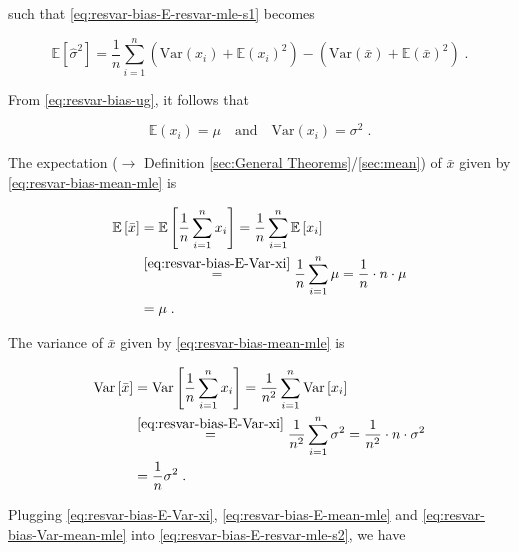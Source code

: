 \documentclass[a4paper,12pt,twoside]{book}
\begin{document}
such that \eqref{eq:resvar-bias-E-resvar-mle-s1} becomes

\begin{equation} \label{eq:resvar-bias-E-resvar-mle-s2}
\mathbb{E}\left[ \hat{\sigma}^2 \right] = \frac{1}{n} \sum_{i=1}^{n} \left( \mathrm{Var}(x_i) + \mathbb{E}(x_i)^2 \right) - \left( \mathrm{Var}(\bar{x}) + \mathbb{E}(\bar{x})^2 \right) \; .
\end{equation}

From \eqref{eq:resvar-bias-ug}, it follows that

\begin{equation} \label{eq:resvar-bias-E-Var-xi}
\mathbb{E}(x_i) = \mu \quad \text{and} \quad \mathrm{Var}(x_i) = \sigma^2 \; .
\end{equation}

The expectation ($\rightarrow$ Definition \ref{sec:General Theorems}/\ref{sec:mean}) of $\bar{x}$ given by \eqref{eq:resvar-bias-mean-mle} is

\begin{equation} \label{eq:resvar-bias-E-mean-mle}
\begin{split}
\mathbb{E}\left[ \bar{x} \right] &= \mathbb{E}\left[ \frac{1}{n} \sum_{i=1}^{n} x_i \right] = \frac{1}{n} \sum_{i=1}^{n} \mathbb{E}\left[ x_i \right] \\
&\overset{\eqref{eq:resvar-bias-E-Var-xi}}{=} \frac{1}{n} \sum_{i=1}^{n} \mu = \frac{1}{n} \cdot n \cdot \mu \\
&= \mu \; .
\end{split}
\end{equation}

The variance of $\bar{x}$ given by \eqref{eq:resvar-bias-mean-mle} is

\begin{equation} \label{eq:resvar-bias-Var-mean-mle}
\begin{split}
\mathrm{Var}\left[ \bar{x} \right] &= \mathrm{Var}\left[ \frac{1}{n} \sum_{i=1}^{n} x_i \right] = \frac{1}{n^2} \sum_{i=1}^{n} \mathrm{Var}\left[ x_i \right] \\
&\overset{\eqref{eq:resvar-bias-E-Var-xi}}{=} \frac{1}{n^2} \sum_{i=1}^{n} \sigma^2 = \frac{1}{n^2} \cdot n \cdot \sigma^2 \\
&= \frac{1}{n} \sigma^2 \; .
\end{split}
\end{equation}

Plugging \eqref{eq:resvar-bias-E-Var-xi}, \eqref{eq:resvar-bias-E-mean-mle} and \eqref{eq:resvar-bias-Var-mean-mle} into \eqref{eq:resvar-bias-E-resvar-mle-s2}, we have
\end{document}
